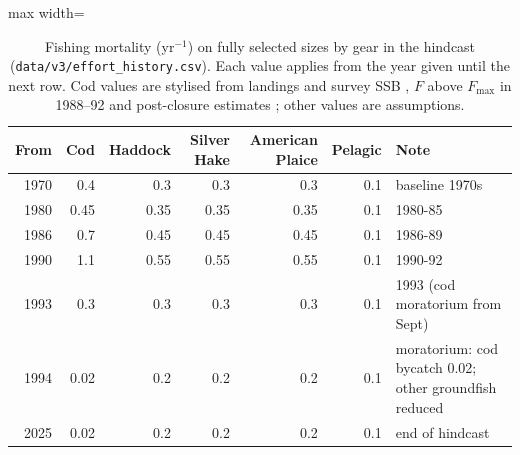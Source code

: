 \documentclass[11pt,letterpaper,fleqn]{article}
\newcommand{\yr}{yr$^{-1}$}
\begin{document}
\clearpage
\printbibliography[title={References}]

\clearpage

\begin{table}[p]\caption{Fishing mortality (\yr{}) on fully selected sizes by gear in the hindcast (\nolinkurl{data/v3/effort_history.csv}). Each value applies from the year given until the next row. Cod values are stylised from landings and survey SSB \autocite{fanning2003assessment}, $F$ above $F_{\max}$ in 1988--92 \autocite{mohn1994assessment} and post-closure estimates \autocite{mohn2012laurentian}; other values are assumptions.}\label{tab:S-effort}
\centering\small\begin{adjustbox}{max width=\textwidth}\begin{tabular}{@{}rrrrrrl@{}}\toprule
From & Cod & Haddock & Silver Hake & American Plaice & Pelagic & Note\\\midrule
1970 & 0.4 & 0.3 & 0.3 & 0.3 & 0.1 & baseline 1970s\\
1980 & 0.45 & 0.35 & 0.35 & 0.35 & 0.1 & 1980-85\\
1986 & 0.7 & 0.45 & 0.45 & 0.45 & 0.1 & 1986-89\\
1990 & 1.1 & 0.55 & 0.55 & 0.55 & 0.1 & 1990-92\\
1993 & 0.3 & 0.3 & 0.3 & 0.3 & 0.1 & 1993 (cod moratorium from Sept)\\
1994 & 0.02 & 0.2 & 0.2 & 0.2 & 0.1 & moratorium: cod bycatch 0.02; other groundfish reduced\\
2025 & 0.02 & 0.2 & 0.2 & 0.2 & 0.1 & end of hindcast\\
\bottomrule\end{tabular}\end{adjustbox}\end{table}
\end{document}
